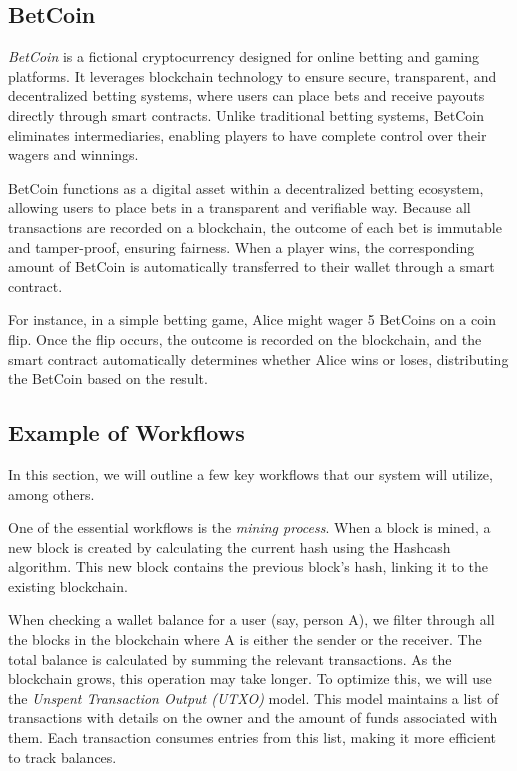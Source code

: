 \documentclass[12pt,a4paper]{report}
\begin{document}
\subsection{BetCoin}

\begin{tcolorbox}[colframe=black!75, colback=white, sharp corners, fonttitle=\bfseries, boxrule=0.5pt, title=\faInfoCircle\ BetCoin]
\textit{BetCoin} is a fictional cryptocurrency designed for online betting and gaming platforms. It leverages blockchain technology to ensure secure, transparent, and decentralized betting systems, where users can place bets and receive payouts directly through smart contracts. Unlike traditional betting systems, BetCoin eliminates intermediaries, enabling players to have complete control over their wagers and winnings.
\end{tcolorbox}

BetCoin functions as a digital asset within a decentralized betting ecosystem, allowing users to place bets in a transparent and verifiable way. Because all transactions are recorded on a blockchain, the outcome of each bet is immutable and tamper-proof, ensuring fairness. When a player wins, the corresponding amount of BetCoin is automatically transferred to their wallet through a smart contract.

For instance, in a simple betting game, Alice might wager 5 BetCoins on a coin flip. Once the flip occurs, the outcome is recorded on the blockchain, and the smart contract automatically determines whether Alice wins or loses, distributing the BetCoin based on the result.

\subsection{Example of Workflows}

In this section, we will outline a few key workflows that our system will utilize, among others.

One of the essential workflows is the \textit{mining process}. When a block is mined, a new block is created by calculating the current hash using the Hashcash algorithm. This new block contains the previous block’s hash, linking it to the existing blockchain.

When checking a wallet balance for a user (say, person A), we filter through all the blocks in the blockchain where A is either the sender or the receiver. The total balance is calculated by summing the relevant transactions. As the blockchain grows, this operation may take longer. To optimize this, we will use the \textit{Unspent Transaction Output (UTXO)} model. This model maintains a list of transactions with details on the owner and the amount of funds associated with them. Each transaction consumes entries from this list, making it more efficient to track balances.
\end{document}
